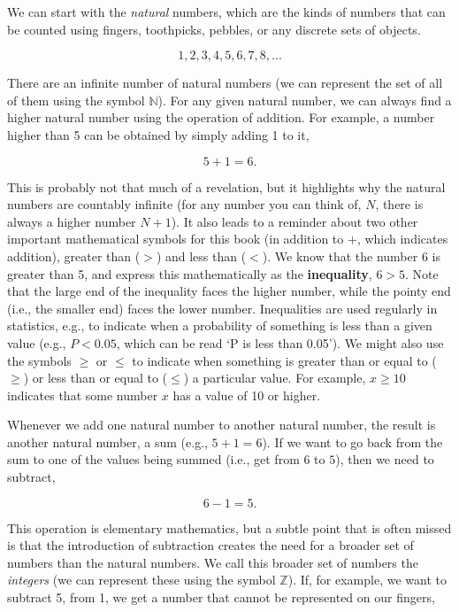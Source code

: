 \documentclass[
]{scrbook}
\begin{document}
We can start with the \emph{natural} numbers, which are the kinds of numbers that can be counted using fingers, toothpicks, pebbles, or any discrete sets of objects.

\[1, 2, 3, 4, 5, 6, 7, 8, ...\]

There are an infinite number of natural numbers (we can represent the set of all of them using the symbol \(\mathbb{N}\)).
For any given natural number, we can always find a higher natural number using the operation of addition.
For example, a number higher than 5 can be obtained by simply adding 1 to it,

\[5 + 1 = 6.\]

This is probably not that much of a revelation, but it highlights why the natural numbers are countably infinite (for any number you can think of, \(N\), there is always a higher number \(N + 1\)).
It also leads to a reminder about two other important mathematical symbols for this book (in addition to \(+\), which indicates addition), greater than (\(>\)) and less than (\(<\)).
We know that the number 6 is greater than 5, and express this mathematically as the \textbf{inequality}, \(6 > 5\).
Note that the large end of the inequality faces the higher number, while the pointy end (i.e., the smaller end) faces the lower number.
Inequalities are used regularly in statistics, e.g., to indicate when a probability of something is less than a given value (e.g., \(P < 0.05\), which can be read `P is less than 0.05').
We might also use the symbols \(\geq\) or \(\leq\) to indicate when something is greater than or equal to (\(\geq\)) or less than or equal to (\(\leq\)) a particular value.
For example, \(x \geq 10\) indicates that some number \(x\) has a value of 10 or higher.

Whenever we add one natural number to another natural number, the result is another natural number, a sum (e.g., \(5 + 1 = 6\)).
If we want to go back from the sum to one of the values being summed (i.e., get from \(6\) to \(5\)), then we need to subtract,

\[6 - 1 = 5.\]

This operation is elementary mathematics, but a subtle point that is often missed is that the introduction of subtraction creates the need for a broader set of numbers than the natural numbers.
We call this broader set of numbers the \emph{integers} (we can represent these using the symbol \(\mathbb{Z}\)).
If, for example, we want to subtract 5, from 1, we get a number that cannot be represented on our fingers,
\end{document}
